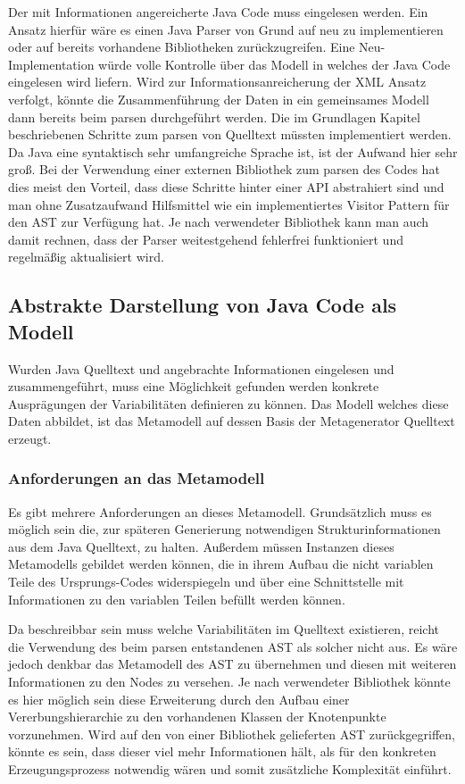 \documentclass[12pt,oneside,a4paper,parskip]{scrbook}
\begin{document}
Der mit Informationen angereicherte Java Code muss eingelesen werden. Ein Ansatz hierfür wäre es einen Java Parser von Grund auf neu zu implementieren oder auf bereits vorhandene Bibliotheken zurückzugreifen. Eine Neu-Implementation würde volle Kontrolle über das Modell in welches der Java Code eingelesen wird liefern. Wird zur Informationsanreicherung der XML Ansatz verfolgt, könnte die Zusammenführung der Daten in ein gemeinsames Modell dann bereits beim parsen durchgeführt werden. Die im Grundlagen Kapitel beschriebenen Schritte zum parsen von Quelltext müssten implementiert werden. Da Java eine syntaktisch sehr umfangreiche Sprache ist, ist der Aufwand hier sehr groß.  Bei der Verwendung einer externen Bibliothek zum parsen des Codes hat dies meist den Vorteil, dass diese Schritte hinter einer API abstrahiert sind und man ohne Zusatzaufwand Hilfsmittel wie ein implementiertes Visitor Pattern für den AST zur Verfügung hat. Je nach verwendeter Bibliothek kann man auch damit rechnen, dass der Parser weitestgehend fehlerfrei funktioniert und regelmäßig aktualisiert wird.

\subsection{Abstrakte Darstellung von Java Code als Modell}\label{sec:codeasmodel}

Wurden Java Quelltext und angebrachte Informationen eingelesen und zusammengeführt, muss eine Möglichkeit gefunden werden konkrete Ausprägungen der Variabilitäten definieren zu können. Das Modell welches diese Daten abbildet, ist das Metamodell auf dessen Basis der Metagenerator Quelltext erzeugt.

\subsubsection{Anforderungen an das Metamodell}

Es gibt mehrere Anforderungen an dieses Metamodell. Grundsätzlich muss es möglich sein die, zur späteren Generierung notwendigen Strukturinformationen aus dem Java Quelltext, zu halten. Außerdem müssen Instanzen dieses Metamodells gebildet werden können, die in ihrem Aufbau die nicht variablen Teile des Ursprungs-Codes widerspiegeln und über eine Schnittstelle mit Informationen zu den variablen Teilen befüllt werden können.

Da beschreibbar sein muss welche Variabilitäten im Quelltext existieren, reicht die Verwendung des beim parsen entstandenen AST als solcher nicht aus. Es wäre jedoch denkbar das Metamodell des AST zu übernehmen und diesen mit weiteren Informationen zu den Nodes zu versehen. Je nach verwendeter Bibliothek könnte es hier möglich sein diese Erweiterung durch den Aufbau einer Vererbungshierarchie zu den vorhandenen Klassen der Knotenpunkte vorzunehmen. Wird auf den von einer Bibliothek gelieferten AST zurückgegriffen, könnte es sein, dass dieser viel mehr Informationen hält, als für den konkreten Erzeugungsprozess notwendig wären und somit zusätzliche Komplexität einführt.
\end{document}
